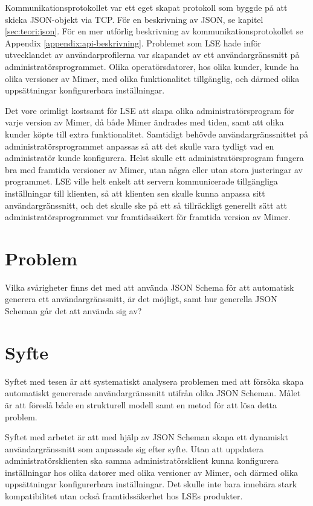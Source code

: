 Kommunikationsprotokollet var ett eget skapat protokoll som byggde på att skicka JSON-objekt via TCP. För en beskrivning av JSON, se kapitel \ref{sec:teori:json}. För en mer utförlig beskrivning av kommunikationsprotokollet se Appendix \ref{appendix:api-beskrivning}. Problemet som LSE hade inför utvecklandet av användarprofilerna var skapandet av ett användargränssnitt på administratörsprogrammet. Olika operatörsdatorer, hos olika kunder, kunde ha olika versioner av Mimer, med olika funktionalitet tillgänglig, och därmed olika uppsättningar konfigurerbara inställningar. 

Det vore orimligt kostsamt för LSE att skapa olika administratörsprogram för varje version av Mimer, då både Mimer ändrades med tiden, samt att olika kunder köpte till extra funktionalitet. Samtidigt behövde användargränssnittet på administratörsprogrammet anpassas så att det skulle vara tydligt vad en administratör kunde konfigurera. Helst skulle ett administratörsprogram fungera bra med framtida versioner av Mimer, utan några eller utan stora justeringar av programmet. LSE ville helt enkelt att servern kommunicerade tillgängliga inställningar till klienten, så att klienten sen skulle kunna anpassa sitt användargränssnitt, och det skulle ske på ett så tillräckligt generellt sätt att administratörsprogrammet var framtidssäkert för framtida version av Mimer.

\section{Problem}
\label{sec:intro:problem}
Vilka svårigheter finns det med att använda JSON Schema för att automatisk generera ett användargränssnitt, är det möjligt, samt hur generella JSON Scheman går det att använda sig av?

\section{Syfte}
\label{sec:intro:syfte}
Syftet med tesen är att systematiskt analysera problemen med att försöka skapa automatiskt genererade användargränssnitt utifrån olika JSON Scheman. Målet är att föreslå både en strukturell modell samt en metod för att lösa detta problem.

Syftet med arbetet är att med hjälp av JSON Scheman skapa ett dynamiskt användargränssnitt som anpassade sig efter syfte. Utan att uppdatera administratörsklienten ska samma administratörsklient kunna konfigurera inställningar hos olika datorer med olika versioner av Mimer, och därmed olika uppsättningar konfigurerbara inställningar. Det skulle inte bara innebära stark kompatibilitet utan också framtidssäkerhet hos LSEs produkter.

